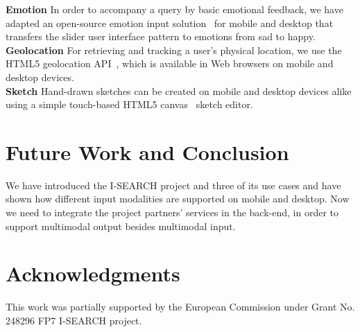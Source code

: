 \documentclass{sig-alternate}
\newcommand{\inlinelistingsize}{\fontsize{8pt}{11pt}}
\let\oldttdefault\ttdefault
\renewcommand{\ttdefault}{pcr}
\let\oldurl\url
\renewcommand{\url}[1]{\inlinelistingsize\oldurl{#1}}
\begin{document}
\noindent \textbf{Emotion}
In order to accompany a query by basic emotional feedback, we have adapted an open-source emotion input solution~\cite{emotionslider} for mobile and desktop that transfers the slider user interface pattern to emotions from sad to happy.\\ 

\noindent \textbf{Geolocation}
For retrieving and tracking a user's physical location, we use the HTML5 geolocation API~\cite{geolocation}, which is available in Web browsers on mobile and desktop devices.\\

\noindent \textbf{Sketch}
Hand-drawn sketches can be created on mobile and desktop devices alike using a simple touch-based HTML5 canvas~\cite{canvas} sketch editor.

\section{Future Work and Conclusion}
We have introduced the \mbox{I-SEARCH} project and three of its use cases and have shown how different input modalities are supported on mobile and desktop. Now we need to integrate the project partners' services in the back-end, in order to support multimodal output besides multimodal input.

\section{Acknowledgments}
This work was partially supported by the European Commission under Grant No. 248296 FP7 \mbox{I-SEARCH} project.

\let\ttdefault\oldttdefault
\let\url\oldurl

\let\oldbibitem\bibitem
\renewcommand{\bibitem}[1]{%
	\ifx\bibstarted\undefined
		\def\bibstarted{1}
		\vspace{.1em}
	\else
		\vspace{-.2em plus .1em minus .1em}
	\fi
\oldbibitem{#1}}




\balancecolumns
\end{document}
